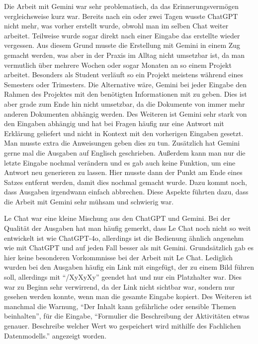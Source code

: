 Die Arbeit mit Gemini war sehr problematisch, da das Erinnerungsvermögen vergleichsweise kurz war. Bereits nach ein oder 
zwei Tagen wusste ChatGPT nicht mehr, was vorher erstellt wurde, obwohl man im selben Chat weiter arbeitet. Teilweise 
wurde sogar direkt nach einer Eingabe das erstellte wieder vergessen. Aus diesem Grund musste die Erstellung mit Gemini 
in einem Zug gemacht werden, was aber in der Praxis im Alltag nicht umsetzbar ist, da man vermutlich über mehrere Wochen 
oder sogar Monaten an so einem Projekt arbeitet. Besonders als Student verläuft so ein Projekt meistens während eines Semesters oder 
Trimesters. Die Alternative wäre, Gemini bei jeder Eingabe den Rahmen des Projektes mit den benötigten Informationen mit zu geben.
Dies ist aber grade zum Ende hin nicht umsetzbar, da die Dokumente von immer mehr anderen Dokumenten abhängig werden.
Des Weiteren ist Gemini sehr stark von den Eingaben abhängig und hat bei Fragen häufig nur eine Antwort mit Erklärung 
geliefert und nicht in Kontext mit den vorherigen Eingaben gesetzt. Man musste extra die Anweisungen geben dies zu tun.
Zusätzlich hat Gemini gerne mal die Ausgaben auf Englisch geschrieben. Außerdem kann man nur die letzte Eingabe nochmal verändern 
und es gab auch keine Funktion, um eine Antwort neu generieren zu lassen. Hier musste dann der Punkt am Ende eines Satzes entfernt werden, 
damit dies nochmal gemacht wurde. Dazu kommt noch, dass Ausgaben irgendwann einfach abbrechen. Diese Aspekte führten dazu, dass die Arbeit mit 
Gemini sehr mühsam und schwierig war. 

Le Chat war eine kleine Mischung aus den ChatGPT und Gemini. Bei der Qualität der Ausgaben hat man häufig gemerkt, dass Le Chat
noch nicht so weit entwickelt ist wie ChatGPT-4o, allerdings ist die Bedienung ähnlich angenehm wie mit ChatGPT und auf jeden Fall 
besser als mit Gemini. Grundsätzlich gab es hier keine besonderen Vorkommnisse bei der Arbeit mit Le Chat. Lediglich wurden bei den 
Ausgaben häufig ein Link mit eingefügt, der zu einem Bild führen soll, allerdings mit ``/XyXyXy'' geendet hat und nur ein Platzhalter war.
Dies war zu Beginn sehr verwirrend, da der Link nicht sichtbar war, sondern nur gesehen werden konnte, wenn man die gesamte Eingabe kopiert.
Des Weiteren ist manchmal die Warnung, ``Der Inhalt kann gefährliche oder sensible Themen beinhalten'', für die Eingabe, 
``Formulier die Beschreibung der Aktivitäten etwas genauer. Beschreibe welcher Wert wo gespeichert wird mithilfe des Fachlichen 
Datenmodells.'' angezeigt worden. 

